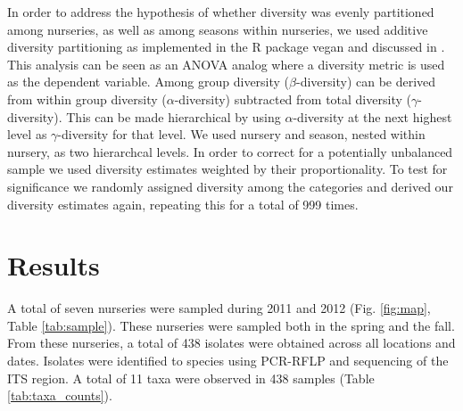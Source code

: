 \documentclass[12pt]{article}
\begin{document}
In order to address the hypothesis of whether diversity was evenly partitioned among nurseries, as well as among seasons within nurseries, we used additive diversity partitioning as implemented in the R package vegan \cite{vegan} and discussed in \cite{lande_1996, christ_etal_2003}.  This analysis can be seen as an ANOVA analog where a diversity metric is used as the dependent variable.  Among group diversity ($\beta$-diversity) can be derived from within group diversity ($\alpha$-diversity) subtracted from total diversity ($\gamma$-diversity).  This can be made hierarchical by using $\alpha$-diversity at the next highest level as $\gamma$-diversity for that level.  We used nursery and season, nested within nursery, as two hierarchcal levels.  In order to correct for a potentially unbalanced sample we used diversity estimates weighted by their proportionality.  To test for significance we randomly assigned diversity among the categories and derived our diversity estimates again, repeating this for a total of 999 times.





\section*{\sffamily\normalsize{Results}}

A total of seven nurseries were sampled during 2011 and 2012 (Fig. \ref{fig:map}, Table \ref{tab:sample}).  These nurseries were sampled both in the spring and the fall.  From these nurseries, a total of 438 isolates were obtained across all locations and dates.  Isolates were identified to species using PCR-RFLP and sequencing of the ITS region. A total of 11 taxa were observed in 438 samples (Table \ref{tab:taxa_counts}).
\end{document}
